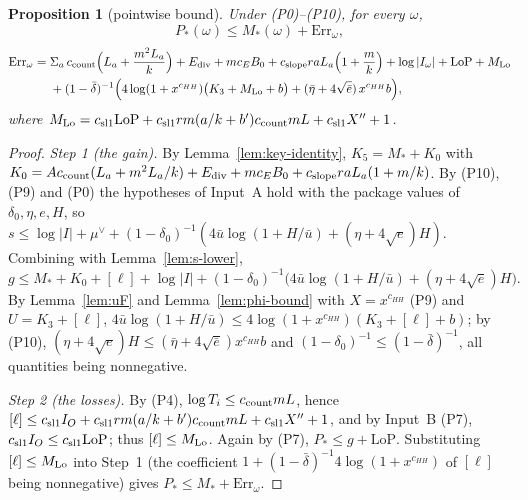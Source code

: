 \documentclass[10pt]{amsart}
\newtheorem{proposition}[theorem]{Proposition}
\theoremstyle{definition}
\theoremstyle{remark}
\begin{document}
\begin{proposition}[pointwise bound]\label{prop:pointwise}
Under (P0)--(P10), for every $\omega$,
\[
 P_*(\omega)\le M_*(\omega)+\mathrm{Err}_\omega,
\]
\[
\begin{aligned}
 \mathrm{Err}_\omega={}&\Sigma_a\,c_{\rm count}\Bigl(L_a+\frac{m^2L_a}k\Bigr)+E_{\rm div}+mc_EB_0
 +c_{\rm slope}raL_a\Bigl(1+\frac mk\Bigr)+\log|I_\omega|+\mathrm{LoP}+M_{\rm Lo}\\
 &+(1-\bar\delta)^{-1}\Bigl(4\log(1+x^{c_{HH}})\bigl(K_3+M_{\rm Lo}+b\bigr)
   +(\bar\eta+4\sqrt{\bar e})\,x^{c_{HH}}b\Bigr),
\end{aligned}
\]
where $M_{\rm Lo}=c_{\rm sl1}\mathrm{LoP}+c_{\rm sl1}rm(a/k+b')c_{\rm count}mL+c_{\rm sl1}X''+1$.
\end{proposition}
\begin{proof}
\emph{Step 1 (the gain).} By Lemma~\ref{lem:key-identity},
$K_5=M_*+K_0$ with $K_0=Ac_{\rm count}(L_a+m^2L_a/k)+E_{\rm div}+mc_EB_0+c_{\rm slope}raL_a(1+m/k)$.
By (P10), (P9) and (P0) the hypotheses of Input~A hold with the package values
of $\delta_0,\eta,e,H$, so
$s\le\log|I|+\mu^\vee+(1-\delta_0)^{-1}(4\bar u\log(1+H/\bar u)+(\eta+4\sqrt e)H)$.
Combining with Lemma~\ref{lem:s-lower},
\[
 g\le M_*+K_0+[\ell]+\log|I|+(1-\delta_0)^{-1}\bigl(4\bar u\log(1+H/\bar u)+(\eta+4\sqrt e)H\bigr).
\]
By Lemma~\ref{lem:uF} and Lemma~\ref{lem:phi-bound} with $X=x^{c_{HH}}$ (P9) and
$U=K_3+[\ell]$, $4\bar u\log(1+H/\bar u)\le4\log(1+x^{c_{HH}})(K_3+[\ell]+b)$; by
(P10), $(\eta+4\sqrt e)H\le(\bar\eta+4\sqrt{\bar e})x^{c_{HH}}b$ and
$(1-\delta_0)^{-1}\le(1-\bar\delta)^{-1}$, all quantities being nonnegative.

\emph{Step 2 (the losses).} By (P4), $\log T_i\le c_{\rm count}mL$, hence
$[\ell]\le c_{\rm sl1}I_O+c_{\rm sl1}rm(a/k+b')c_{\rm count}mL+c_{\rm sl1}X''+1$,
and by Input~B (P7), $c_{\rm sl1}I_O\le c_{\rm sl1}\mathrm{LoP}$; thus $[\ell]\le M_{\rm Lo}$.
Again by (P7), $P_*\le g+\mathrm{LoP}$. Substituting $[\ell]\le M_{\rm Lo}$ into Step~1
(the coefficient $1+(1-\bar\delta)^{-1}4\log(1+x^{c_{HH}})$ of $[\ell]$ being
nonnegative) gives $P_*\le M_*+\mathrm{Err}_\omega$.
\end{proof}
\end{document}
